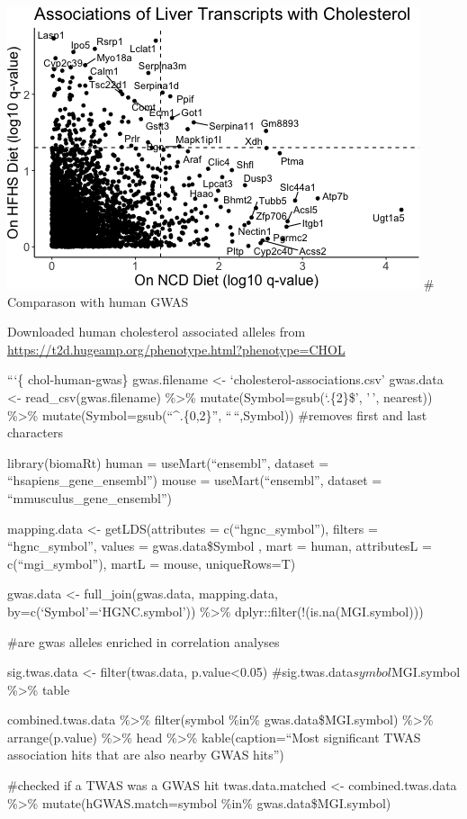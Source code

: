 \documentclass[
]{article}
\begin{document}
\includegraphics{figures/twas-chol-integrated-4.png} \# Comparason with
human GWAS

Downloaded human cholesterol associated alleles from
\url{https://t2d.hugeamp.org/phenotype.html?phenotype=CHOL}

```\{ chol-human-gwas\} gwas.filename \textless-
`cholesterol-associations.csv' gwas.data \textless-
read\_csv(gwas.filename) \%\textgreater\% mutate(Symbol=gsub(`.\{2\}\$',
'\,', nearest)) \%\textgreater\% mutate(Symbol=gsub(``\^{}.\{0,2\}'',
``\,``,Symbol)) \#removes first and last characters

library(biomaRt) human = useMart(``ensembl'', dataset =
``hsapiens\_gene\_ensembl'') mouse = useMart(``ensembl'', dataset =
``mmusculus\_gene\_ensembl'')

mapping.data \textless- getLDS(attributes = c(``hgnc\_symbol''), filters
= ``hgnc\_symbol'', values = gwas.data\$Symbol , mart = human,
attributesL = c(``mgi\_symbol''), martL = mouse, uniqueRows=T)

gwas.data \textless- full\_join(gwas.data, mapping.data,
by=c(`Symbol'=`HGNC.symbol')) \%\textgreater\%
dplyr::filter(!(is.na(MGI.symbol)))

\#are gwas alleles enriched in correlation analyses

sig.twas.data \textless- filter(twas.data, p.value\textless0.05)
\#sig.twas.data\(symbol %
\)MGI.symbol \%\textgreater\% table

combined.twas.data \%\textgreater\% filter(symbol \%in\%
gwas.data\$MGI.symbol) \%\textgreater\% arrange(p.value)
\%\textgreater\% head \%\textgreater\% kable(caption=``Most significant
TWAS association hits that are also nearby GWAS hits'')

\#checked if a TWAS was a GWAS hit twas.data.matched \textless-
combined.twas.data \%\textgreater\% mutate(hGWAS.match=symbol \%in\%
gwas.data\$MGI.symbol)
\end{document}
